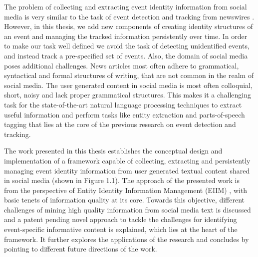 \documentclass[12pt]{article}
\begin{document}
The problem of collecting and extracting event identity information from social media is very similar to the task of event detection and tracking from newswires \cite{allan1998line,kumaran2004text}. However, in this thesis, we add new components of creating identity structures of an event and managing the tracked information persistently over time. In order to make our task well defined we avoid the task of detecting unidentified events, and instead track a pre-specified set of events. Also, the domain of social media poses additional challenges. News articles most often adhere to grammatical, syntactical and formal structures of writing, that are not common in the realm of social media. The user generated content in social media is most often colloquial, short, noisy and lack proper grammatical structures. This makes it a challenging task for the state-of-the-art natural language processing techniques to extract useful information and perform tasks like entity extraction and parts-of-speech tagging that lies at the core of the previous research on event detection and tracking.

The work presented in this thesis establishes the conceptual design and implementation of a framework capable of collecting, extracting and persistently managing event identity information from user generated textual content shared in social media (shown in Figure 1.1). The approach of the presented work is from the perspective of Entity Identity Information Management (EIIM) \cite{zhou2011entity}, with basic tenets of information quality at its core. Towards this objective, different challenges of mining high quality information from social media text is discussed and a patent pending novel approach to tackle the challenges for identifying event-specific informative content is explained, which lies at the heart of the framework. It further explores the applications of the research and concludes by pointing to different future directions of the work. 


\end{document}
